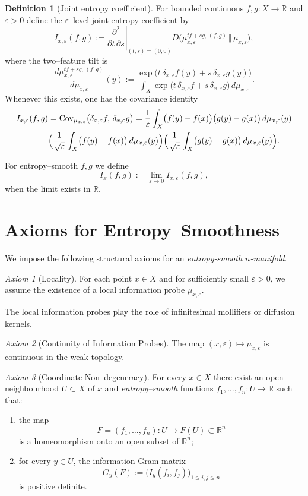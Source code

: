 \documentclass[11pt]{amsart}
\theoremstyle{definition}
\newtheorem{definition}[theorem]{Definition}
\theoremstyle{remark}
\newtheorem{axiom}{Axiom}
\begin{document}
\begin{definition}[Joint entropy coefficient]
For bounded continuous $f,g:X\to\mathbb{R}$ and $\varepsilon>0$ define the $\varepsilon$--level joint entropy coefficient by
\[
I_{x,\varepsilon}(f,g)
:=\left.\frac{\partial^2}{\partial t\,\partial s}\right|_{(t,s)=(0,0)}
D\bigl(\mu^{t f+s g,\,(f,g)}_{x,\varepsilon}\,\Vert\,\mu_{x,\varepsilon}\bigr),
\]
where the two--feature tilt is
\[
\frac{d\mu^{t f+s g,\,(f,g)}_{x,\varepsilon}}{d\mu_{x,\varepsilon}}(y)
:= \frac{\exp\bigl(t\,\delta_{x,\varepsilon} f(y)+s\,\delta_{x,\varepsilon} g(y)\bigr)}{\int_X\exp\bigl(t\,\delta_{x,\varepsilon} f+s\,\delta_{x,\varepsilon} g\bigr)\,d\mu_{x,\varepsilon}}.
\]
Whenever this exists, one has the covariance identity
\begin{align*}
I_{x,\varepsilon}(f,g)&=\mathrm{Cov}_{\mu_{x,\varepsilon}}\bigl(\delta_{x,\varepsilon} f,\,\delta_{x,\varepsilon} g\bigr)
=\frac{1}{\varepsilon}\int_X \bigl(f(y)-f(x)\bigr)\bigl(g(y)-g(x)\bigr)\,d\mu_{x,\varepsilon}(y) \\
-&\Bigl(\frac{1}{\sqrt{\varepsilon}}\int_X \bigl(f(y)-f(x)\bigr)\,d\mu_{x,\varepsilon}(y)\Bigr)
\Bigl(\frac{1}{\sqrt{\varepsilon}}\int_X \bigl(g(y)-g(x)\bigr)\,d\mu_{x,\varepsilon}(y)\Bigr).
\end{align*}

For entropy--smooth $f,g$ we define
\[
I_x(f,g):=\lim_{\varepsilon\to 0} I_{x,\varepsilon}(f,g),
\]
when the limit exists in $\mathbb{R}$.
\end{definition}
\section{Axioms for Entropy--Smoothness}
We impose the following structural axioms for an \emph{entropy-smooth $n$-manifold}.

\begin{axiom}[Locality]
\label{axiom:1}
For each point $x\in X$ and for sufficiently small $\varepsilon>0$, we assume the existence of a local information probe $\mu_{x,\varepsilon}$.
\end{axiom}
The local information probes play the role of infinitesimal mollifiers or diffusion kernels.

\begin{axiom}[Continuity of Information Probes]
\label{axiom:2}
The map $(x,\varepsilon)\mapsto \mu_{x,\varepsilon}$ is continuous in the weak topology.
\end{axiom}

\begin{axiom}[Coordinate Non--degeneracy]
\label{axiom:3}
For every $x\in X$ there exist an open neighbourhood $U\subset X$ of $x$
and \emph{entropy--smooth} functions $f_1,\dots,f_n : U \to \mathbb{R}$ such 
that:
\begin{enumerate}
\item the map 
\[
F = (f_1,\dots,f_n) : U \longrightarrow F(U)\subset\mathbb{R}^n
\]
is a homeomorphism onto an open subset of $\mathbb{R}^n$;
\item for every $y\in U$, the information Gram matrix
\[
G_y(F) := \big(I_y(f_i,f_j)\big)_{1\le i,j\le n}
\]
is positive definite.
\end{enumerate}
\end{axiom}
\end{document}

